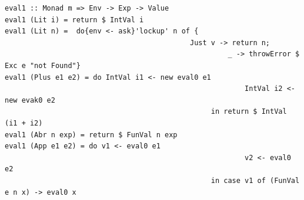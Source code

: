 \documentclass[ngerman,a4paper]{report}
\begin{document}
\begin{lstlisting}
eval1 :: Monad m => Env -> Exp -> Value
eval1 (Lit i) = return $ IntVal i
eval1 (Lit n) =  do{env <- ask}'lockup' n of {
											Just v -> return n; 
													 _ -> throwError $ Exc e "not Found"}
eval1 (Plus e1 e2) = do IntVal i1 <- new eval0 e1
														 IntVal i2 <- new evak0 e2
												 in return $ IntVal (i1 + i2)
eval1 (Abr n exp) = return $ FunVal n exp
eval1 (App e1 e2) = do v1 <- eval0 e1
														 v2 <- eval0 e2
												 in case v1 of (FunVal e n x) -> eval0 x				
\end{lstlisting}
\end{document}
